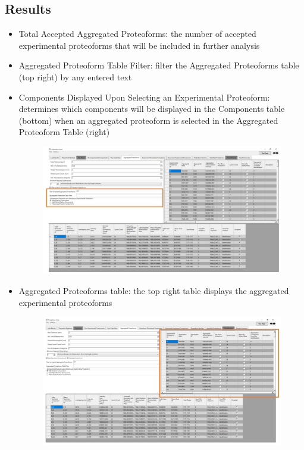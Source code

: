 \subsection{Results}
\begin{itemize}
	\item Total Accepted Aggregated Proteoforms: the number of accepted experimental proteoforms that will be included in further analysis
	\item Aggregated Proteoform Table Filter: filter the Aggregated Proteoforms table (top right) by any entered text
	\item Components Displayed Upon Selecting an Experimental Proteoform: determines which components will be displayed in the Components table (bottom) when an aggregated proteoform is selected in the Aggregated Proteoform Table (right)
	\begin{figure}[h]
\centering
\includegraphics[scale=0.5]{figures/aggregated_proteoforms2.jpg}
\end{figure}
\pagebreak
	\item Aggregated Proteoforms table: the top right table displays the aggregated experimental proteoforms
		\begin{figure}[h]
\centering
\includegraphics[scale=0.5]{figures/aggregated_proteoforms3.jpg}

\end{figure}
\end{itemize}
